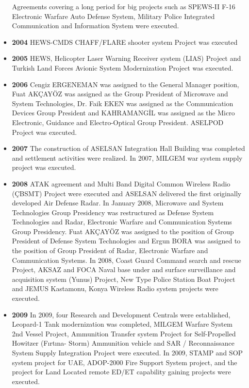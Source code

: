 \begin{itemize}
\subitem Agreements covering a long period for big projects such as SPEWS-II F-16 Electronic Warfare Auto Defense System, Military Police Integrated Communication and Information System were executed.
\item \textbf{ 2004 }
\subitem HEWS-CMDS CHAFF/FLARE shooter system Project was executed
\item \textbf{ 2005 }
\subitem HEWS, Helicopter Laser Warning Receiver system (LIAS) Project and Turkish Land Forces Avionic System Modernization Project was executed.
\item \textbf{ 2006 }
\subitem Cengiz ERGENEMAN was assigned to the General Manager position, Fuat AKÇAYÖZ was assigned as the Group President of Microwave and System Technologies, Dr. Faik EKEN was assigned as the Communication Devices Group President and KAHRAMANGİL was assigned as the Micro Electronic, Guidance and Electro-Optical Group President.
\subitem ASELPOD Project was executed.
\item \textbf{ 2007 }
\subitem The construction of ASELSAN Integration Hall Building was completed and settlement activities were realized.
\subitem In 2007, MILGEM war system supply project was executed.
\item \textbf{ 2008 }
\subitem ATAK agreement and Multi Band Digital Common Wireless Radio (ÇBSMT) Project were executed and ASELSAN delivered the first originally developed Air Defense Radar.
\subitem In January 2008, Microwave and System Technologies Group Presidency was restructured as Defense System Technologies and Radar, Electronic Warfare and Communication Systems Group Presidency. Fuat AKÇAYÖZ was assigned to the position of Group President of Defense System Technologies and Ergun BORA was assigned to the position of Group President of Radar, Electronic Warfare and Communication Systems.
\subitem In 2008, Coast Guard Command search and rescue Project, AKSAZ and FOCA Naval base under and surface surveillance and acquisition system (Yunus) Project, New Type Police Station Boat Project and JEMUS Kastamonu, Konya Wireless Radio system projects were executed. 
\item \textbf{ 2009 }
\subitem In 2009, four Research and Development Centrals were established, Leopard-1 Tank modernization was completed, MILGEM Warfare System 2nd Vessel Project, Ammunition Transfer system Project for Self-Propelled Howitzer (Fırtına- Storm) Ammunition vehicle and SAR / Reconnaissance System Supply Integration Project were executed.
\subitem In 2009, STAMP and SOP system project for UAE, ADOP-2000 Fire Support System project, and the project for Land Located remote ED/ET capability gaining projects were executed.

\end{itemize}
